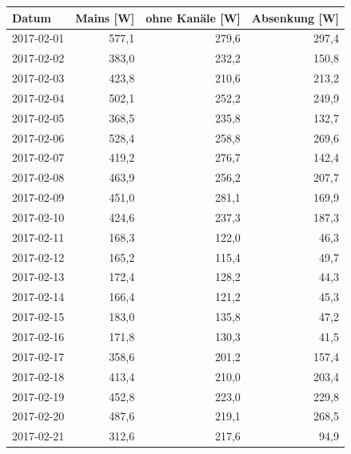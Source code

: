 \begin{tabular}{lrrr}
\toprule
Datum & Mains [W] & ohne Kanäle [W] & Absenkung [W] \\
\midrule
2017-02-01 & 577,1 & 279,6 & 297,4 \\
2017-02-02 & 383,0 & 232,2 & 150,8 \\
2017-02-03 & 423,8 & 210,6 & 213,2 \\
2017-02-04 & 502,1 & 252,2 & 249,9 \\
2017-02-05 & 368,5 & 235,8 & 132,7 \\
2017-02-06 & 528,4 & 258,8 & 269,6 \\
2017-02-07 & 419,2 & 276,7 & 142,4 \\
2017-02-08 & 463,9 & 256,2 & 207,7 \\
2017-02-09 & 451,0 & 281,1 & 169,9 \\
2017-02-10 & 424,6 & 237,3 & 187,3 \\
2017-02-11 & 168,3 & 122,0 & 46,3 \\
2017-02-12 & 165,2 & 115,4 & 49,7 \\
2017-02-13 & 172,4 & 128,2 & 44,3 \\
2017-02-14 & 166,4 & 121,2 & 45,3 \\
2017-02-15 & 183,0 & 135,8 & 47,2 \\
2017-02-16 & 171,8 & 130,3 & 41,5 \\
2017-02-17 & 358,6 & 201,2 & 157,4 \\
2017-02-18 & 413,4 & 210,0 & 203,4 \\
2017-02-19 & 452,8 & 223,0 & 229,8 \\
2017-02-20 & 487,6 & 219,1 & 268,5 \\
2017-02-21 & 312,6 & 217,6 & 94,9 \\
\bottomrule
\end{tabular}
